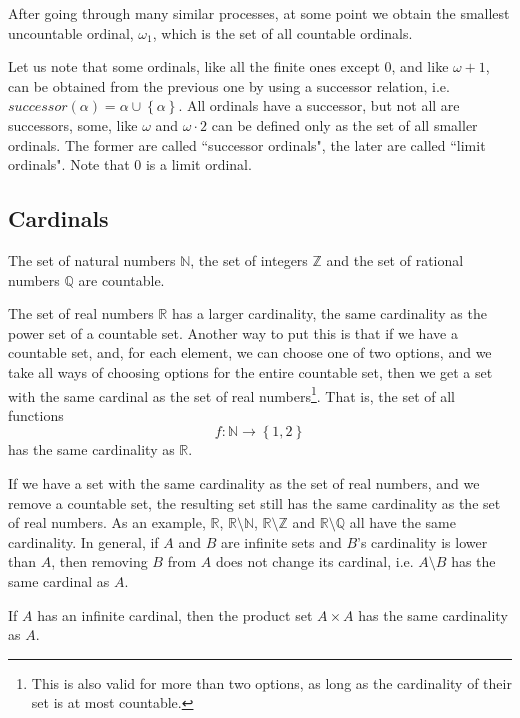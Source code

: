 \documentclass[a4paper
,draft
]{article}
\def\reale{\mathbb{R}}
\def\intregi{\mathbb{Z}}
\def\naturale{\mathbb{N}}
\def\rationale{\mathbb{Q}}
\newcommand{\multime}[1]{\left\{ #1 \right\}}
\newcommand{\ghilimele}[1]{``#1"}
\begin{document}
After going through many similar processes, at some point we obtain the
smallest uncountable ordinal, $\omega_1$, which is the set of all
countable ordinals.

Let us note that some ordinals, like all the finite ones except $0$,
and like $\omega+1$, can be obtained from the previous one by using
a successor relation, i.e. $successor(\alpha) = \alpha\cup\multime{\alpha}$.
All ordinals have a successor, but not all are successors, some, like
$\omega$ and $\omega\cdot 2$ can be defined only as the set of all
smaller ordinals. The former are called \ghilimele{successor ordinals},
the later are called \ghilimele{limit ordinals}. Note that $0$ is a limit
ordinal.

\subsection{Cardinals}
\label{sec:cardinals}

The set of natural numbers $\naturale$, the set of integers $\intregi$ and
the set of rational numbers $\rationale$ are countable.

The set of real numbers $\reale$ has a larger cardinality, the same cardinality
as the power set of a countable set. Another way to put this is that
if we have a countable set, and, for each element, we can choose one of two
options,
and we take all ways of choosing options for the entire countable set,
then we get a set with the same cardinal as the set of real numbers\footnote{
    This is also valid for more than two options, as long as the cardinality
    of their set is at most countable.
  }.
That is, the set of all functions
$$
f : \naturale \longrightarrow \multime{1, 2}
$$
has the same cardinality as $\reale$.

If we have a set with the same cardinality as the set of real numbers, and
we remove a countable set, the resulting set still has the same cardinality
as the set of real numbers. As an example, $\reale$, $\reale\setminus\naturale$,
$\reale\setminus\intregi$ and $\reale\setminus\rationale$ all have the same
cardinality. In general, if $A$ and $B$ are infinite sets and
$B$'s cardinality is lower than $A$, then removing $B$ from $A$ does not change
its cardinal, i.e. $A\setminus B$ has the same cardinal as $A$.

If $A$ has an infinite cardinal, then the product set $A\times A$ has the same
cardinality as $A$.

\printbibliography
\end{document}
